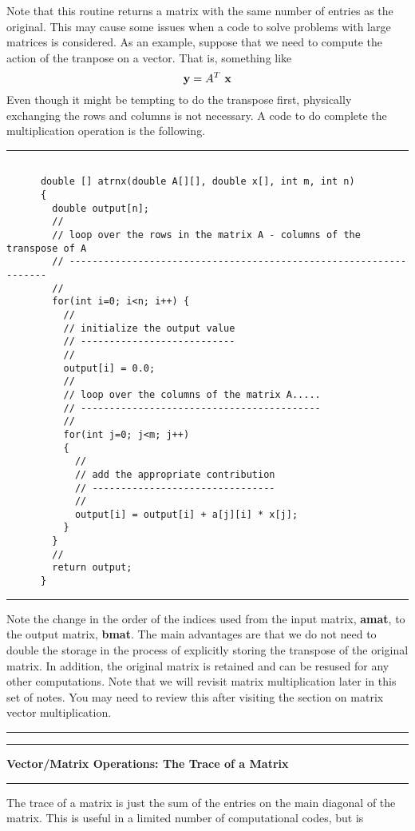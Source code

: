 \documentclass[10pt,fleqn]{article}
\begin{document}
Note that this routine returns a matrix with the same number of entries as the
original. This may cause some issues when a code to solve problems with large
matrices is considered. As an example, suppose that we need to compute the
action of the tranpose on a vector. That is, something like
$$
  {\bf y} = A^T\ {\bf x}
$$
Even though it might be tempting to do the transpose first, physically
exchanging the rows and columns is not necessary. A code to do complete the
multiplication operation is the following.
\vskip0.1in\hrule\vskip0.1in
\begin{verbatim}

      double [] atrnx(double A[][], double x[], int m, int n)
      {
        double output[n];
        //
        // loop over the rows in the matrix A - columns of the transpose of A
        // ------------------------------------------------------------------
        //
        for(int i=0; i<n; i++) {
          //
          // initialize the output value
          // ---------------------------
          //
          output[i] = 0.0;
          //
          // loop over the columns of the matrix A.....
          // ------------------------------------------
          //
          for(int j=0; j<m; j++)
          {
            //
            // add the appropriate contribution
            // --------------------------------
            //
            output[i] = output[i] + a[j][i] * x[j];
          }
        }
        //
        return output;
      }

\end{verbatim}
\vskip0.1in\hrule\vskip0.1in
Note the change in the order of the indices used from the input matrix,
{\bf amat}, to the output matrix, {\bf bmat}. The main advantages are that we
do not need to double the storage in the process of explicitly storing the
transpose of the original matrix. In addition, the original matrix is retained
and can be resused for any other computations. Note that we will revisit matrix
multiplication later in this set of notes. You may need to review this after
visiting the section on matrix vector multiplication.
\vskip0.1in\hrule\vskip0.1in
\newpage
\vskip0.1in\hrule\vskip0.1in
\noindent
{\bf Vector/Matrix Operations: The Trace of a Matrix}
\vskip0.1in\hrule\vskip0.1in
\noindent
The trace of a matrix is just the sum of the entries on the main diagonal of
the matrix. This is useful in a limited number of computational codes, but is
\end{document}
